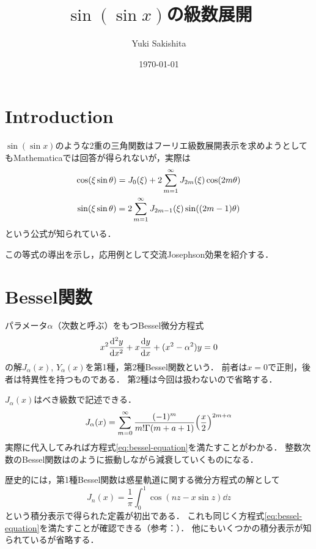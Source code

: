 \documentclass[dvipdfmx,autodetect-engine,12pt,fleqn]{jsarticle}
\title{$\sin(\sin x)$の級数展開}
\author{Yuki Sakishita}
\date{\today}
\begin{document}
\maketitle

\setcounter{section}{-1}
\section{Introduction}
$\sin(\sin x)$のような2重の三角関数はフーリエ級数展開表示を求めようとしてもMathematicaでは回答が得られないが，実際は
\begin{gather*}
    \cos\rbra*{\xi \sin\theta} = J_0(\xi) + 2\sum_{m=1}^\infty J_{2m}(\xi)\cos\rbra{2m\theta}\\
    \sin\rbra*{\xi \sin\theta} = 2\sum_{m=1}^\infty J_{2m-1}(\xi)\sin\rbra{(2m-1)\theta}
\end{gather*}
という公式が知られている．

この等式の導出を示し，応用例として交流Josephson効果を紹介する．

\section{Bessel関数}
パラメータ$\alpha$（次数と呼ぶ）をもつBessel微分方程式
\begin{equation}
\label{eq:bessel-equation}
    x^2\dv[2]{y}{x}+x\dv{y}{x}+(x^2-\alpha^2)y=0
\end{equation}
の解$J_\alpha(x)$, $Y_\alpha(x)$を第1種，第2種Bessel関数という．
前者は$x=0$で正則，後者は特異性を持つものである．
第2種は今回は扱わないので省略する．

$J_\alpha(x)$はべき級数で記述できる．
\begin{equation}
\label{eq:bessel-func-as-series}
    J_\alpha(x)=\sum_{m=0}^\infty \frac{(-1)^m}{m!\Gamma(m+a+1)} \qty(\frac{x}{2})^{2m+\alpha}
\end{equation}
実際に代入してみれば方程式\eqref{eq:bessel-equation}を満たすことがわかる．
整数次数のBessel関数はのように振動しながら減衰していくものになる．


歴史的には，第1種Bessel関数は惑星軌道に関する微分方程式の解として
\begin{equation}
    J_n(x)=\frac1\pi\int_0^1 \cos(nz-x\sin z)\dd z
\end{equation}
という積分表示で得られた定義が初出である．
これも同じく方程式\eqref{eq:bessel-equation}を満たすことが確認できる（参考：\cite{bessel}）．
他にもいくつかの積分表示が知られているが省略する．
\end{document}
